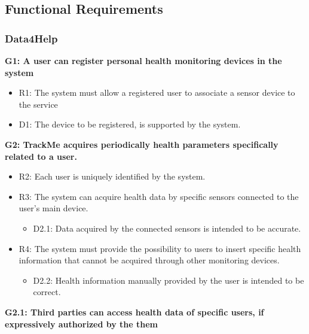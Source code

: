 \paragraph{}


{\color{Blue}\subsection{Functional Requirements}}

{\color{Blue}\subsubsection{Data4Help}}

\textbf{G1: A user can register personal health monitoring devices in the system}
\begin{itemize}
	\item R1: The system must allow a registered user to associate a sensor device to the service
	\item D1: The device to be registered, is supported by the system.
\end{itemize}

\textbf{G2: TrackMe acquires periodically health parameters specifically related to a user.}
\begin{itemize}
	\item R2: Each user is uniquely identified by the system.
	\item R3: The system can acquire health data by specific sensors connected to the user's main device.
	\begin{itemize}
		\item D2.1: Data acquired by the connected sensors is intended to be accurate.
	\end{itemize}
	\item R4: The system must provide the possibility to users to insert specific health information that cannot be acquired through other monitoring devices.
	\begin{itemize}
		\item D2.2: Health information manually provided by the user is intended to be correct.
	\end{itemize}   
	
\end{itemize}
\textbf{G2.1: Third parties can access health data of specific users, if expressively authorized by the them}

